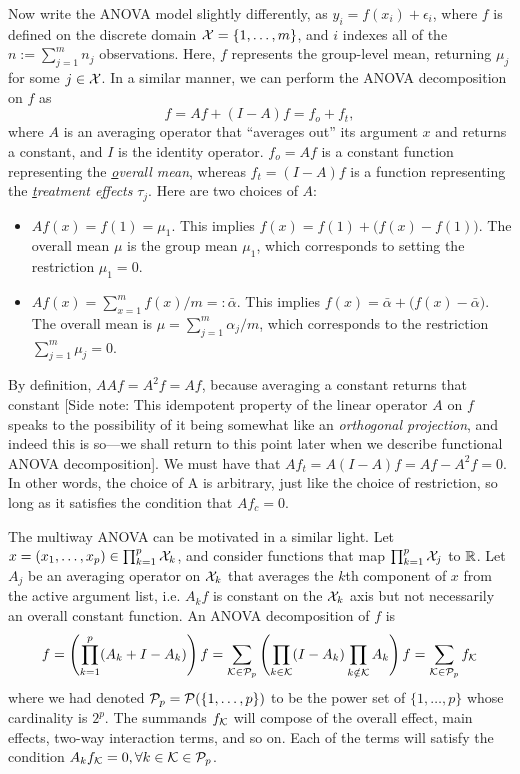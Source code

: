 Now write the ANOVA model slightly differently, as $y_{i} = f(x_i) + \epsilon_{i}$, where $f$ is defined on the discrete domain ${\mathcal X} = \{1,\dots,m\}$, and $i$ indexes all of the $n := \sum_{j=1}^m n_j$ observations.
Here, $f$ represents the group-level mean, returning $\mu_j$ for some $j\in{\mathcal X}$.
In a similar manner, we can perform the ANOVA decomposition on $f$ as
\[
  f = Af + (I-A)f = f_o + f_t,
\]
where $A$ is an averaging operator that ``averages out'' its argument $x$ and returns a constant, and $I$ is the identity operator.
$f_o = Af$ is a constant function representing the \textit{\underline{o}verall mean}, whereas $f_t = (I - A)f$ is a function representing the \textit{\underline{t}reatment effects} $\tau_j$.
Here are two choices of $A$:
\begin{itemize}
  \item $Af(x) = f(1) = \mu_1$. This implies $f(x) = f(1) + \big(f(x) - f(1)\big)$. The overall mean $\mu$ is the group mean $\mu_1$, which corresponds to setting the restriction $\mu_1=0$.
  \item $Af(x) = \sum_{x=1}^m f(x) / m =: \bar \alpha$. This implies $f(x) = \bar \alpha + \big( f(x) - \bar \alpha \big)$. The overall mean is $\mu = \sum_{j=1}^m \alpha_j/m$, which corresponds to the restriction $\sum_{j=1}^m \mu_j = 0$.
\end{itemize}
By definition, $AAf = A^2f = Af$, because averaging a constant returns that constant
[Side note: This idempotent property of the linear operator $A$ on $f$ speaks to the possibility of it being somewhat like an \emph{orthogonal projection}, and indeed this is so---we shall return to this point later when we describe functional ANOVA decomposition].
We must have that $Af_t = A(I - A)f = Af - A^2f = 0$.
In other words, the choice of A is arbitrary, just like the choice of restriction, so long as it satisfies the condition that $Af_c = 0$.

The multiway ANOVA can be motivated in a similar light. 
Let $x = (x_1,\dots,x_p) \in \prod_{k=1}^p {\mathcal X}_k$, and consider functions that map $\prod_{k=1}^p {\mathcal X}_j$ to $\mathbb{R}$.
Let $A_j$ be an averaging operator on ${\mathcal X}_k$ that averages the $k$th component of $x$ from the active argument list, i.e. $A_kf$ is constant on the ${\mathcal X}_k$ axis but not necessarily an overall constant function.
An ANOVA decomposition of $f$ is
\[
  f = \left( \prod_{k=1}^p (A_k + I - A_k) \right)f = \sum_{{\mathcal K}\in{\mathcal P}_p} \left( \prod_{k\in{\mathcal K}} (I - A_k) \prod_{k\notin{\mathcal K}} A_k \right)f = \sum_{{\mathcal K}\in{\mathcal P}_p} f_{\mathcal K}
\]
where we had denoted ${\mathcal P}_p = {\mathcal P}(\{1,\dots,p\})$ to be the power set of $\{1,\dots,p\}$ whose cardinality is $2^p$.
The summands $f_{\mathcal K}$ will compose of the overall effect, main effects, two-way interaction terms, and so on.
Each of the terms will satisfy the condition $A_kf_{\mathcal K} = 0, \forall k \in {\mathcal K} \in {\mathcal P}_p$.

